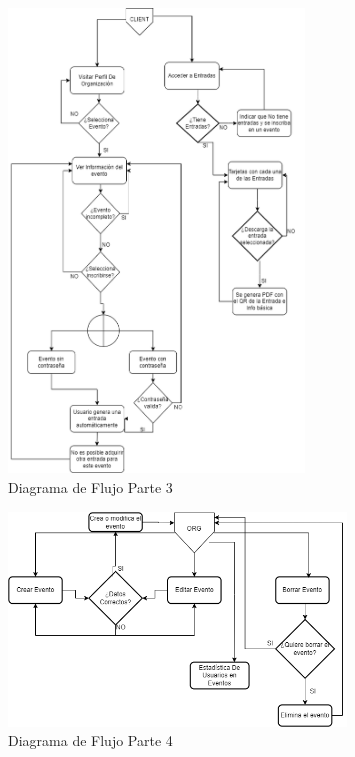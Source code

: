 \newpage
\begin{figure}[h]
    \centering
    \includegraphics[width=0.7\textwidth]{Cliente.png} 
    \caption{Diagrama de Flujo Parte 3}
    \label{fig:flujoEvs2}
\end{figure}
\newpage
\begin{figure}[h]
    \centering
    \includegraphics[width=0.8\textwidth]{Org.png} 
    \caption{Diagrama de Flujo Parte 4}
    \label{fig:flujoEvs3}
\end{figure}
    
